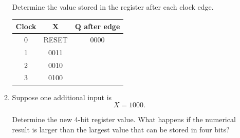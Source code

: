 \documentclass{article}
\begin{document}
\begin{enumerate}
\begin{enumerate}
Determine the value stored in the register after each clock edge.

\begin{center}
\renewcommand{\arraystretch}{1.25}
\begin{tabular}{c|c|c}
\hline
\textbf{Clock} & $\boldsymbol{X}$ & $\boldsymbol{Q}$ \textbf{ after edge} \\
\hline
0 & RESET & 0000 \\
1 & 0011 & \\
2 & 0010 & \\
3 & 0100 & \\
\hline
\end{tabular}
\end{center}

\item Suppose one additional input is
\[
X = 1000.
\]

Determine the new 4-bit register value. What happens if the numerical
result is larger than the largest value that can be stored in four
bits?

\vspace{2.5cm}

\end{enumerate}
\end{enumerate}
\end{document}
